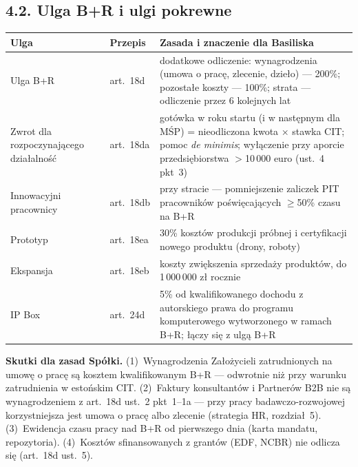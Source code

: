 \documentclass[11pt,a4paper]{report}
\begin{document}
\subsection*{4.2. Ulga B+R i ulgi pokrewne}

\begin{center}
\small
\begin{tabularx}{\linewidth}{@{}>{\raggedright\arraybackslash}p{3.6cm} >{\raggedright\arraybackslash}p{1.8cm} X@{}}
\toprule
\textbf{Ulga} & \textbf{Przepis} & \textbf{Zasada i znaczenie dla Basiliska} \\
\midrule
Ulga B+R & art.~18d & dodatkowe odliczenie: wynagrodzenia (umowa o pracę, zlecenie, dzieło) --- 200\%; pozostałe koszty --- 100\%; strata --- odliczenie przez 6 kolejnych lat \\
Zwrot dla rozpoczynającego działalność & art.~18da & gotówka w roku startu (i w następnym dla MŚP) = nieodliczona kwota $\times$ stawka CIT; pomoc \emph{de minimis}; wyłączenie przy aporcie przedsiębiorstwa $>$10\,000 euro (ust.~4 pkt~3) \\
Innowacyjni pracownicy & art.~18db & przy stracie --- pomniejszenie zaliczek PIT pracowników poświęcających $\geq$50\% czasu na B+R \\
Prototyp & art.~18ea & 30\% kosztów produkcji próbnej i certyfikacji nowego produktu (drony, roboty) \\
Ekspansja & art.~18eb & koszty zwiększenia sprzedaży produktów, do 1\,000\,000 zł rocznie \\
IP Box & art.~24d & 5\% od kwalifikowanego dochodu z autorskiego prawa do programu komputerowego wytworzonego w ramach B+R; łączy się z ulgą B+R \\
\bottomrule
\end{tabularx}
\end{center}

\begin{Prawo}
\textbf{Skutki dla zasad Spółki.} (1)~Wynagrodzenia Założycieli zatrudnionych na umowę o pracę są kosztem kwalifikowanym B+R --- odwrotnie niż przy warunku zatrudnienia w estońskim CIT. (2)~Faktury konsultantów i Partnerów B2B nie są wynagrodzeniem z art.~18d ust.~2 pkt~1--1a --- przy pracy badawczo-rozwojowej korzystniejsza jest umowa o pracę albo zlecenie (strategia HR, rozdział~5). (3)~Ewidencja czasu pracy nad B+R od pierwszego dnia (karta mandatu, repozytoria). (4)~Kosztów sfinansowanych z grantów (EDF, NCBR) nie odlicza się (art.~18d ust.~5).
\end{Prawo}
\end{document}
